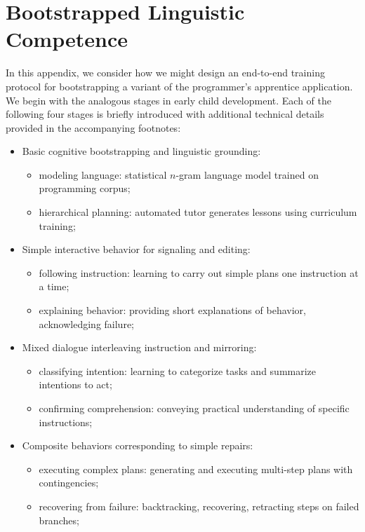 
\section{Bootstrapped Linguistic Competence}


In this appendix, we consider how we might design an end-to-end training protocol for bootstrapping a variant of the programmer's apprentice application. We begin with the analogous stages in early child development. Each of the following four stages is briefly introduced with additional technical details provided in the accompanying footnotes:
%
\begin{itemize}
%
\item Basic cognitive bootstrapping and linguistic grounding\endnote{}: %
%
  \begin{itemize}
%
  \item modeling language: statistical $n$-gram language model trained on programming corpus;
%
  \item hierarchical planning: automated tutor generates lessons using curriculum training;
%
  \end{itemize}
%
\item Simple interactive behavior for signaling and editing\endnote{}: %
%
  \begin{itemize}
%
  \item following instruction: learning to carry out simple plans one instruction at a time;
%
  \item explaining behavior: providing short explanations of behavior, acknowledging failure;
%
  \end{itemize}
%
\item Mixed dialogue interleaving instruction and mirroring\endnote{}: %
%
  \begin{itemize}
%
  \item classifying intention: learning to categorize tasks and summarize intentions to act;
%
  \item confirming comprehension: conveying practical understanding of specific instructions;
%
  \end{itemize}
%
\item Composite behaviors corresponding to simple repairs\endnote{}: %
%
  \begin{itemize}
%
  \item executing complex plans: generating and executing multi-step plans with contingencies;
%
  \item recovering from failure: backtracking, recovering, retracting steps on failed branches;
%
  \end{itemize}
%
\end{itemize}

